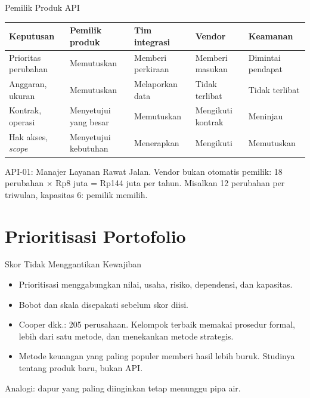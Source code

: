 \documentclass[aspectratio=169, table, 12pt]{beamer}
\begin{document}
\begin{frame}{{\Large Pemilik Produk API}}
  \footnotesize
  \begin{tabularx}{\textwidth}{>{\raggedright\arraybackslash}p{2.75cm}
      >{\raggedright\arraybackslash}X >{\raggedright\arraybackslash}X >{\raggedright\arraybackslash}p{2.35cm} >{\raggedright\arraybackslash}p{2.35cm}}
    \hline
    \textbf{Keputusan} & \textbf{Pemilik produk} & \textbf{Tim integrasi} & \textbf{Vendor} & \textbf{Keamanan} \\ \hline
    Prioritas perubahan & Memutuskan & Memberi perkiraan & Memberi masukan & Dimintai pendapat \\ \hline
    Anggaran, ukuran & Memutuskan & Melaporkan data & Tidak terlibat & Tidak terlibat \\ \hline
    Kontrak, operasi & Menyetujui yang besar & Memutuskan & Mengikuti kontrak & Meninjau \\ \hline
    Hak akses, \textit{scope} & Menyetujui kebutuhan & Menerapkan & Mengikuti & Memutuskan \\ \hline
  \end{tabularx}

  \vspace{6pt}
  \small API-01: Manajer Layanan Rawat Jalan. Vendor bukan otomatis pemilik: 18 perubahan $\times$ Rp8 juta = Rp144 juta per tahun. Misalkan 12 perubahan per triwulan, kapasitas 6: pemilik memilih.
\end{frame}

\section{Prioritisasi Portofolio}

\begin{frame}{{\Large Skor Tidak Menggantikan Kewajiban}}
  \vspace{8pt}
  \begin{itemize}
    \item Prioritisasi menggabungkan nilai, usaha, risiko, dependensi, dan kapasitas.
    \item Bobot dan skala disepakati sebelum skor diisi.
    \item Cooper dkk.: 205 perusahaan. Kelompok terbaik memakai prosedur formal, lebih dari satu metode, dan menekankan metode strategis.
    \item Metode keuangan yang paling populer memberi hasil lebih buruk. Studinya tentang produk baru, bukan API.
  \end{itemize}
  \vspace{6pt}
  {\small Analogi: dapur yang paling diinginkan tetap menunggu pipa air.}
\end{frame}
\end{document}
